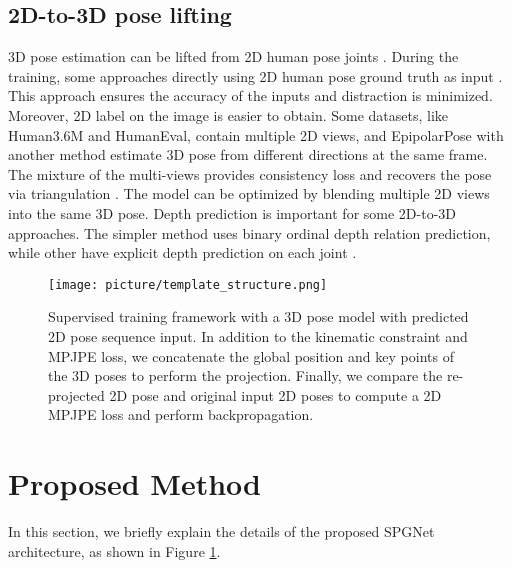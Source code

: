 \documentclass[runningheads]{llncs}
\begin{document}
\subsection{2D-to-3D pose lifting} 3D pose estimation can be lifted from 2D human pose joints \cite{MartinezHRL17,Chen_2016_CVPR,Pavlakos_2018}. During the training, some approaches directly using 2D human pose ground truth as input \cite{Kocabas_2019_CVPR,Drover_2018_ECCVW}. This approach ensures the accuracy of the inputs and distraction is minimized. Moreover, 2D label on the image is easier to obtain. Some datasets, like Human3.6M and HumanEval, contain multiple 2D views, and EpipolarPose with another method estimate 3D pose from different directions at the same frame. The mixture of the multi-views provides consistency loss and recovers the pose via triangulation \cite{Kocabas_2019_CVPR}. The model can be optimized by blending multiple 2D views into the same 3D pose. Depth prediction is important for some 2D-to-3D approaches. The simpler method uses binary ordinal depth relation prediction, while other have explicit depth prediction on each joint \cite{Chen_2016_CVPR,Nie_2017_Monocular3H,Pavlakos_2018}.



\begin{figure}[!htp]
\texttt{[image: picture/template\_structure.png]}
\caption{Supervised training framework with a 3D pose model with predicted 2D pose sequence input. In addition to the kinematic constraint and MPJPE loss, we concatenate the global position and key points of the 3D poses to perform the projection. Finally, we compare the re-projected 2D pose and original input 2D poses to compute a 2D MPJPE loss and perform backpropagation.} \label{model}
\end{figure}

\section{Proposed Method}

In this section, we briefly explain the details of the proposed SPGNet architecture, as shown in Figure \ref{model}.
\end{document}
